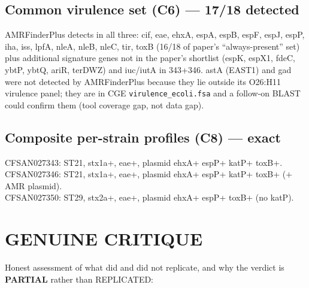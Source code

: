 \documentclass[11pt,letterpaper]{article}
\begin{document}
\subsection{Common virulence set (C6) --- 17/18 detected}
AMRFinderPlus detects in all three: cif, eae, ehxA, espA, espB, espF, espJ, espP, iha,
iss, lpfA, nleA, nleB, nleC, tir, toxB (16/18 of paper's ``always-present'' set) plus
additional signature genes not in the paper's shortlist (espK, espX1, fdeC, ybtP,
ybtQ, ariR, terDWZ) and iuc/iutA in 343+346. astA (EAST1) and gad were not detected
by AMRFinderPlus because they lie outside its O26:H11 virulence panel; they are in
CGE \texttt{virulence\_ecoli.fsa} and a follow-on BLAST could confirm them (tool
coverage gap, not data gap).

\subsection{Composite per-strain profiles (C8) --- exact}
CFSAN027343: ST21, stx1a+, eae+, plasmid ehxA+ espP+ katP+ toxB+.\\
CFSAN027346: ST21, stx1a+, eae+, plasmid ehxA+ espP+ katP+ toxB+ ($+$ AMR plasmid).\\
CFSAN027350: ST29, stx2a+, eae+, plasmid ehxA+ espP+ toxB+ (no katP).

\section{GENUINE CRITIQUE}
\label{sec:critique}

Honest assessment of what did and did not replicate, and why the verdict is
\textbf{PARTIAL} rather than REPLICATED:
\end{document}
